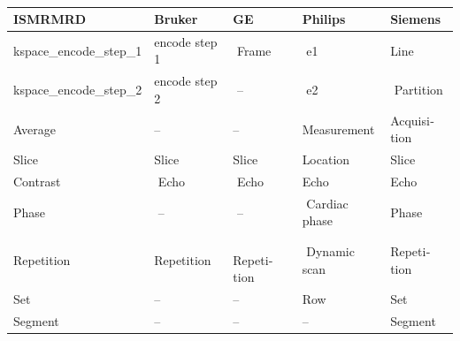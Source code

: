 \begin{table}[b!]
	\begin{latin}\footnotesize
	\begin{tabularx}{\linewidth}{lXXXX}
	\hline
	ISMRMRD & Bruker & GE & Philips & Siemens \\ \hline
	kspace\_encode\_step\_1 & encode step 1 &‌ Frame&‌ e1 & Line\\
	kspace\_encode\_step\_2 & encode step 2 &‌ – &‌ e2 &‌ Partition\\
	Average & – & – &  Measurement & Acquisition\\
	Slice & Slice‌&  Slice &  Location & Slice \\
	Contrast &‌ Echo &‌ Echo & Echo & Echo\\
	Phase &‌ ‌– &‌ – &‌ Cardiac phase & Phase\\
	Repetition & Repetition &‌ Repetition&‌ Dynamic scan& Repetition\\
	Set & – & – &‌Row& Set\\
	Segment & – & – & – & Segment\\ \hline
	\end{tabularx}
	\end{latin}
\caption{}
\end{table}


